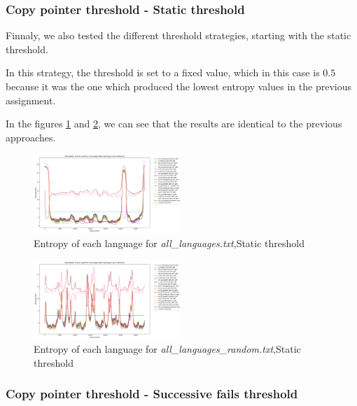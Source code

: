 \documentclass{article}
\begin{document}
\subsubsection{Copy pointer threshold - Static threshold}
\label{subsubsec:results_locate_lang_static_threshold}

Finnaly, we also tested the different threshold strategies, starting with the static threshold.

In this strategy, the threshold is set to a fixed value, which in this case is $0.5$ because it was the one which produced the lowest entropy values in the previous assignment.

In the figures \ref{fig:all_languages_t_n} and \ref{fig:all_languages_random_t_n}, we can see that the results are identical to the previous approaches.

\begin{figure}
    \centering
    \includegraphics[width=0.5\textwidth]{../results/all_languages/-t_n:0.5.png}
    \caption{Entropy of each language for \textit{all\_languages.txt},Static threshold}
    \label{fig:all_languages_t_n}
\end{figure}

\begin{figure}
    \centering
    \includegraphics[width=0.5\textwidth]{../results/all_languages_random/-t_n:0.5.png}
    \caption{Entropy of each language for \textit{all\_languages\_random.txt},Static threshold}
    \label{fig:all_languages_random_t_n}
\end{figure}

\subsubsection{Copy pointer threshold - Successive fails threshold}
\label{subsubsec:results_locate_lang_successive_fails_threshold}
\end{document}
